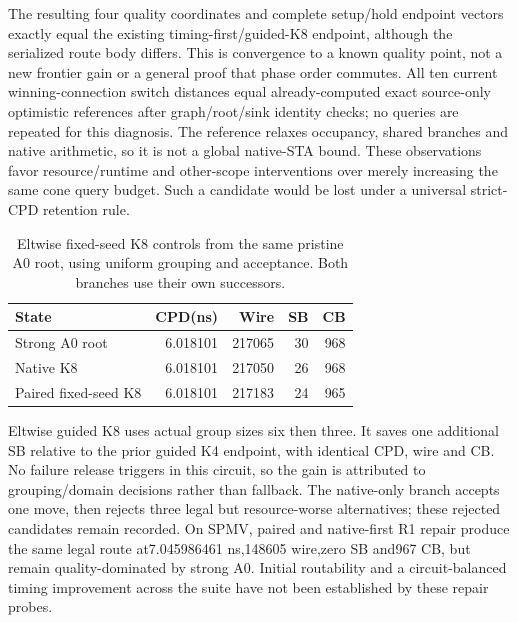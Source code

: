 \documentclass[conference,10pt]{IEEEtran}
\begin{document}
The resulting four quality coordinates and complete setup/hold endpoint vectors exactly equal the existing timing-first/guided-K8 endpoint, although the serialized route body differs. This is convergence to a known quality point, not a new frontier gain or a general proof that phase order commutes. All ten current winning-connection switch distances equal already-computed exact source-only optimistic references after graph/root/sink identity checks; no queries are repeated for this diagnosis. The reference relaxes occupancy, shared branches and native arithmetic, so it is not a global native-STA bound. These observations favor resource/runtime and other-scope interventions over merely increasing the same cone query budget. Such a candidate would be lost under a universal strict-CPD retention rule.

\begin{table}[t]
\centering\caption{Eltwise fixed-seed K8 controls from the same pristine A0 root, using uniform grouping and acceptance. Both branches use their own successors.}
\label{tab:eltwise}
\small
\begin{tabular}{lrrrr}\hline
State & CPD(ns) & Wire & SB & CB\\\hline
Strong A0 root &6.018101&217065&30&968\\
Native K8 &6.018101&217050&26&968\\
Paired fixed-seed K8 &6.018101&217183&24&965\\\hline
\end{tabular}
\end{table}
Eltwise guided K8 uses actual group sizes six then three. It saves one additional SB relative to the prior guided K4 endpoint, with identical CPD, wire and CB. No failure release triggers in this circuit, so the gain is attributed to grouping/domain decisions rather than fallback. The native-only branch accepts one move, then rejects three legal but resource-worse alternatives; these rejected candidates remain recorded. On SPMV, paired and native-first R1 repair produce the same legal route at7.045986461 ns,148605 wire,zero SB and967 CB, but remain quality-dominated by strong A0. Initial routability and a circuit-balanced timing improvement across the suite have not been established by these repair probes.
\end{document}
